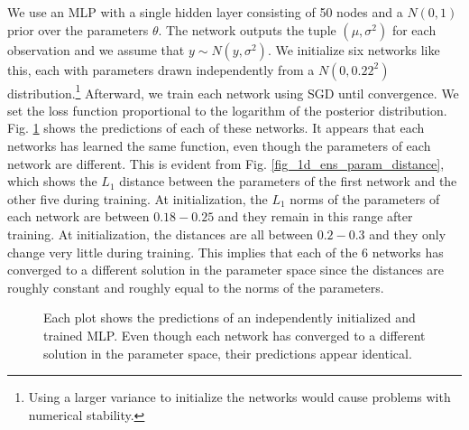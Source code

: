 \documentclass[12pt]{article}
\begin{document}
We use an MLP with a single hidden layer consisting of 50 nodes and a $N(0, 1)$ prior over the parameters $\theta$. The network outputs the tuple $(\mu, \sigma^2)$ for each observation and we assume that $y \sim N(y, \sigma^2)$. We initialize six networks like this, each with parameters drawn independently from a $N(0, 0.22^2)$ distribution.\footnote{Using a larger variance to initialize the networks would cause problems with numerical stability.} Afterward, we train each network using SGD until convergence. We set the loss function proportional to the logarithm of the posterior distribution. Fig. \ref{fig_1d_ens_predictions} shows the predictions of each of these networks. It appears that each networks has learned the same function, even though the parameters of each network are different. This is evident from Fig. \ref{fig_1d_ens_param_distance}, which shows the $L_1$ distance between the parameters of the first network and the other five during training. At initialization, the $L_1$ norms of the parameters of each network are between $0.18 - 0.25$ and they remain in this range after training. At initialization, the distances are all between $0.2 - 0.3$ and they only change very little during training. This implies that each of the 6 networks has converged to a different solution in the parameter space since the distances are roughly constant and roughly equal to the norms of the parameters.

\begin{figure}[H]
\centering
{}
\caption{Each plot shows the predictions of an independently initialized and trained MLP. Even though each network has converged to a different solution in the parameter space, their predictions appear identical.}
\label{fig_1d_ens_predictions}
\end{figure}
\end{document}
